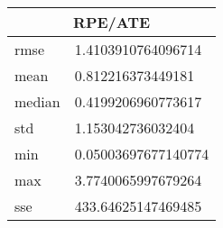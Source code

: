 \begin{table}[!ht] 
 \centering 
 \begin{tabular}{|l|l|} \hline 
 \multicolumn{2}{|c|}{RPE/ATE} \\ \hline 
 rmse & 1.4103910764096714 \\ \hline 
mean & 0.812216373449181 \\ \hline 
median & 0.4199206960773617 \\ \hline 
std & 1.153042736032404 \\ \hline 
min & 0.05003697677140774 \\ \hline 
max & 3.7740065997679264 \\ \hline 
sse & 433.64625147469485 \\ \hline 
\end{tabular} 
 \end{table}